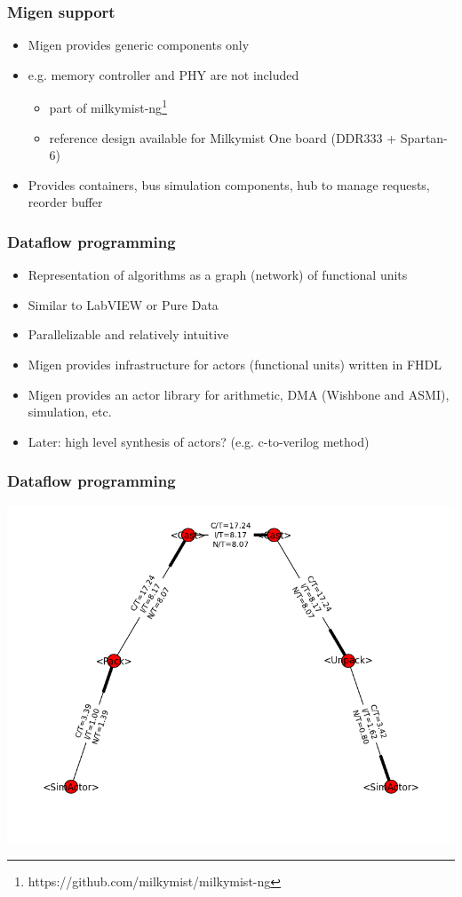 \documentclass[serif,mathserif]{beamer}
\begin{document}
\begin{frame}
\frametitle{Migen support}
\begin{itemize}
\item Migen provides generic components only
\item e.g. memory controller and PHY are not included
\begin{itemize}
\item part of milkymist-ng\footnote{https://github.com/milkymist/milkymist-ng}
\item reference design available for Milkymist One board (DDR333 + Spartan-6)
\end{itemize}
\item Provides containers, bus simulation components, hub to manage requests, reorder buffer
\end{itemize}
\end{frame}

\begin{frame}
\frametitle{Dataflow programming}
\begin{itemize}
\item Representation of algorithms as a graph (network) of functional units
\item Similar to LabVIEW or Pure Data
\item Parallelizable and relatively intuitive
\item Migen provides infrastructure for actors (functional units) written in FHDL
\item Migen provides an actor library for arithmetic, DMA (Wishbone and ASMI), simulation, etc.
\item Later: high level synthesis of actors? (e.g. c-to-verilog method)
\end{itemize}
\end{frame}

\begin{frame}
\frametitle{Dataflow programming}
\includegraphics[width=\textwidth]{agperf.png}
\end{frame}
\end{document}
